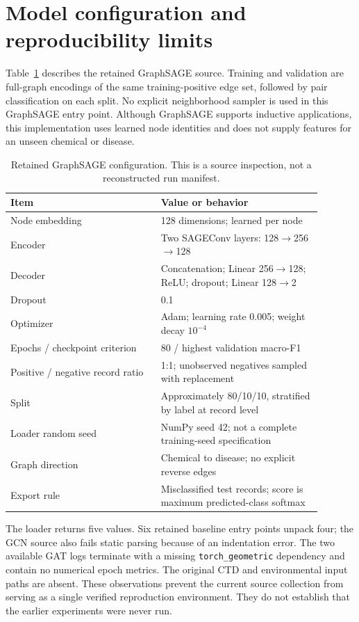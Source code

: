 \section{Model configuration and reproducibility limits}
Table~\ref{tab:config} describes the retained GraphSAGE source. Training and validation are full-graph encodings of the same training-positive edge set, followed by pair classification on each split. No explicit neighborhood sampler is used in this GraphSAGE entry point. Although GraphSAGE supports inductive applications, this implementation uses learned node identities and does not supply features for an unseen chemical or disease.

\begin{table}[htbp]
\centering\small
\caption{Retained GraphSAGE configuration. This is a source inspection, not a reconstructed run manifest.}
\label{tab:config}
\begin{tabular}{p{0.43\linewidth}p{0.46\linewidth}}
\toprule
Item & Value or behavior \\
\midrule
Node embedding & 128 dimensions; learned per node \\
Encoder & Two SAGEConv layers: 128$\to$256$\to$128 \\
Decoder & Concatenation; Linear 256$\to$128; ReLU; dropout; Linear 128$\to$2 \\
Dropout & 0.1 \\
Optimizer & Adam; learning rate 0.005; weight decay $10^{-4}$ \\
Epochs / checkpoint criterion & 80 / highest validation macro-F1 \\
Positive / negative record ratio & 1:1; unobserved negatives sampled with replacement \\
Split & Approximately 80/10/10, stratified by label at record level \\
Loader random seed & NumPy seed 42; not a complete training-seed specification \\
Graph direction & Chemical to disease; no explicit reverse edges \\
Export rule & Misclassified test records; score is maximum predicted-class softmax \\
\bottomrule
\end{tabular}
\end{table}

The loader returns five values. Six retained baseline entry points unpack four; the GCN source also fails static parsing because of an indentation error. The two available GAT logs terminate with a missing \texttt{torch\_geometric} dependency and contain no numerical epoch metrics. The original CTD and environmental input paths are absent. These observations prevent the current source collection from serving as a single verified reproduction environment. They do not establish that the earlier experiments were never run.


